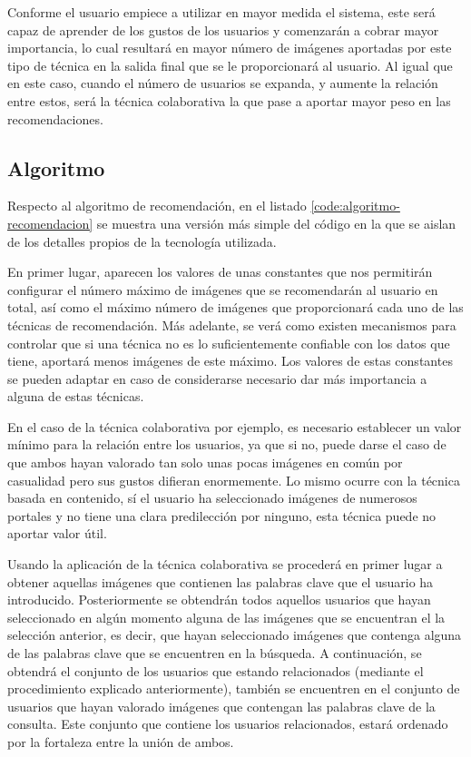 Conforme el usuario empiece a utilizar en mayor medida el sistema, este será capaz de aprender de los gustos de los usuarios y comenzarán a cobrar mayor importancia, lo cual resultará en mayor número de imágenes aportadas por este tipo de técnica en la salida final que se le proporcionará al usuario. Al igual que en este caso, cuando el número de usuarios se expanda, y aumente la relación entre estos, será la técnica colaborativa la que pase a aportar mayor peso en las recomendaciones.


\subsection{Algoritmo}

Respecto al algoritmo de recomendación, en el listado \ref{code:algoritmo-recomendacion} se muestra una versión más simple del código en la que se aislan de los detalles propios de la tecnología utilizada. 

En primer lugar, aparecen los valores de unas constantes que nos permitirán configurar el número máximo de imágenes que se recomendarán al usuario en total, así como el máximo número de imágenes que proporcionará cada uno de las técnicas de recomendación. Más adelante, se verá como existen mecanismos para controlar que si una técnica no es lo suficientemente confiable con los datos que tiene, aportará menos imágenes de este máximo. Los valores de estas constantes se pueden adaptar en caso de considerarse necesario dar más importancia a alguna de estas técnicas.

En el caso de la técnica colaborativa por ejemplo, es necesario establecer un valor mínimo para la relación entre los usuarios, ya que si no, puede darse el caso de que ambos hayan valorado tan solo unas pocas imágenes en común por casualidad pero sus gustos difieran enormemente. Lo mismo ocurre con la técnica basada en contenido, sí el usuario ha seleccionado imágenes de numerosos portales y no tiene una clara predilección por ninguno, esta técnica puede no aportar valor útil.

Usando la aplicación de la técnica colaborativa se procederá en primer lugar a obtener aquellas imágenes que contienen las palabras clave que el usuario ha introducido. Posteriormente se obtendrán todos aquellos usuarios que hayan seleccionado en algún momento alguna de las  imágenes que se encuentran el la selección anterior, es decir, que hayan seleccionado imágenes que contenga alguna de las palabras clave que se encuentren en la búsqueda. A continuación, se obtendrá el conjunto de los usuarios que estando relacionados (mediante el procedimiento explicado anteriormente), también se encuentren en el conjunto de usuarios que hayan valorado imágenes que contengan las palabras clave de la consulta. Este conjunto que contiene los usuarios relacionados, estará ordenado por la fortaleza entre la unión de ambos.

